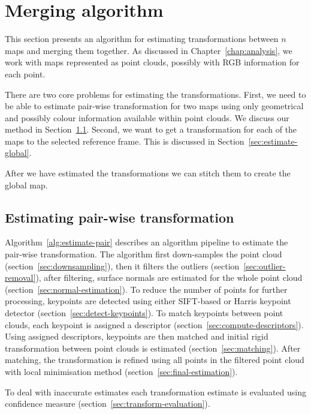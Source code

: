 \chapter{Merging algorithm}
\label{chap:mergingalgorithm}


This section presents an algorithm for estimating transformations between $n$ maps and merging them together. As discussed in Chapter~\ref{chap:analysis}, we work with maps represented as point clouds, possibly with \gls{RGB} information for each point.

There are two core problems for estimating the transformations. First, we need to be able to estimate pair-wise transformation for two maps using only geometrical and possibly colour information available within point clouds. We discuss our method in Section~\ref{sec:estimate-pair-wise}. Second, we want to get a transformation for each of the maps to the selected reference frame. This is discussed in Section~\ref{sec:estimate-global}.

After we have estimated the transformations we can stitch them to create the global map.

\section{Estimating pair-wise transformation}
\label{sec:estimate-pair-wise}

Algorithm~\ref{alg:estimate-pair} describes an algorithm pipeline to estimate the pair-wise transformation. The algorithm first down-samples the point cloud (section~\ref{sec:downsampling}), then it filters the outliers (section~\ref{sec:outlier-removal}), after filtering, surface normals are estimated for the whole point cloud (section~\ref{sec:normal-estimation}). To reduce the number of points for further processing, keypoints are detected using either \gls{SIFT}-based or Harris keypoint detector (section~\ref{sec:detect-keypoints}). To match keypoints between point clouds, each keypoint is assigned a descriptor (section~\ref{sec:compute-descriptors}). Using assigned descriptors, keypoints are then matched and initial rigid transformation between point clouds is estimated (section~\ref{sec:matching}). After matching, the transformation is refined using all points in the filtered point cloud with local minimisation method (section~\ref{sec:final-estimation}).

To deal with inaccurate estimates each transformation estimate is evaluated using confidence measure (section~\ref{sec:transform-evaluation}).

